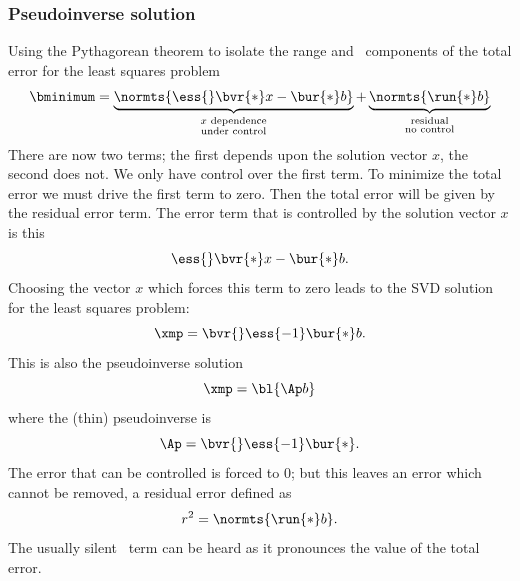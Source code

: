 \subsubsection{Pseudoinverse solution}  %
Using the Pythagorean theorem to isolate the range and \ns \ components of the total error for the least squares problem
\begin{equation*}
  \bminimum = \underbrace{\normts{ \ess{} \bvr{*} x -\bur{*} b  }}_{\substack{x \text{ dependence}\\\text{under control}}} + \underbrace{\normts{ \run{*} b  }}_{\substack{\text{residual}\\\text{no control}}}
\end{equation*}
There are now two terms; the first depends upon the solution vector $x$, the second does not. We only have control over the first term. To minimize the total error we must drive the first term to zero. Then the total error will be given by the residual error term.
The error term that is controlled by the solution vector $x$ is this
\begin{equation}
  \ess{} \bvr{*} x - \bur{*} b .
\end{equation}
Choosing the vector $x$ which forces this term to zero  leads to the SVD solution for the least squares problem:
\begin{equation*}
  \xmp = \bvr{} \ess{-1} \bur{*} b.
  \label{eq:svd soln}
\end{equation*}
This is also the pseudoinverse solution
\begin{equation*}
  \xmp = \bl{\Ap b}
\end{equation*}
where the (thin) pseudoinverse is
\begin{equation*}
  \Ap = \bvr{} \ess{-1} \bur{*}.
  \label{eq:mpptsvd}
\end{equation*}
The error that can be controlled is forced to 0; but this leaves an error which cannot be removed, a residual error defined as
  \begin{equation*}   %
    r^{2} = \normts{ \run{*} b  } .
  \end{equation*}
The usually silent \ns \ term can be heard as it pronounces the value of the total error.

